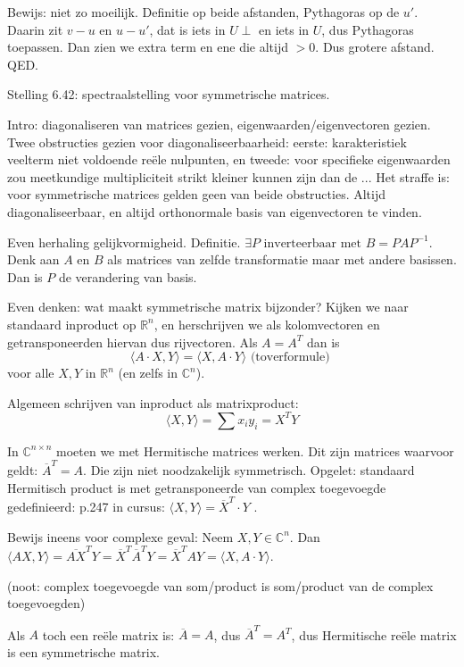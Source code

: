 \documentclass{article}
\begin{document}
Bewijs: niet zo moeilijk. Definitie op beide afstanden, Pythagoras op de $u'$. Daarin zit $v-u$ en $u-u'$, dat is iets in $U\perp$ en iets in $U$, dus Pythagoras toepassen. Dan zien we extra term en ene die altijd $>0$. Dus grotere afstand. QED. 

Stelling 6.42: spectraalstelling voor symmetrische matrices.

Intro: diagonaliseren van matrices gezien, eigenwaarden/eigenvectoren gezien. Twee obstructies gezien voor diagonaliseerbaarheid: eerste: karakteristiek veelterm niet voldoende re\"ele nulpunten, en tweede: 
voor specifieke eigenwaarden zou meetkundige multipliciteit strikt kleiner kunnen zijn dan de ... 
Het straffe is: voor symmetrische matrices gelden geen van beide obstructies. Altijd diagonaliseerbaar, en altijd orthonormale basis van eigenvectoren te vinden. 

Even herhaling gelijkvormigheid. 
Definitie. $\exists P \text{ inverteerbaar met } B=PAP^{-1}$. 
Denk aan $A$ en $B$ als matrices van zelfde transformatie maar met andere basissen. Dan is $P$ de verandering van basis. 

Even denken: wat maakt symmetrische matrix bijzonder? Kijken we naar standaard inproduct op $\mathbb{R}^n$, en herschrijven we als kolomvectoren en getransponeerden hiervan dus rijvectoren. 
Als $A=A^T$ dan is 
\[ \langle A \cdot X,Y \rangle = \langle X,A \cdot Y \rangle \text{  (toverformule) } \] 
voor alle $X,Y$ in $\mathbb{R}^n$ (en zelfs in $\mathbb{C}^n$).

Algemeen schrijven van inproduct als matrixproduct: 
\[ \langle X,Y \rangle = \sum x_i y_i = X^T Y \] 

In $\mathbb{C}^{n \times n}$ moeten we met Hermitische matrices werken. Dit zijn matrices waarvoor geldt: $ \overline{A}^T = A $. Die zijn niet noodzakelijk symmetrisch. 
Opgelet: standaard Hermitisch product is met getransponeerde van complex toegevoegde gedefinieerd: p.247 in cursus: $\langle X,Y \rangle = \overline{X}^T \cdot Y$ . 

Bewijs ineens voor complexe geval: 
Neem $X,Y \in \mathbb{C}^n$. Dan $\langle AX,Y \rangle = \overline{AX}^T Y =  \overline{X}^T \overline{A}^T  Y =  \overline{X}^T A Y = \langle X , A \cdot Y \rangle $. 

(noot: complex toegevoegde van som/product is som/product van de complex toegevoegden) 

Als $A$ toch een re\"ele matrix is: $\overline{A} = A$, dus $  \overline{A}^T = A^T $, dus Hermitische re\"ele matrix is een symmetrische matrix. 
\end{document}
